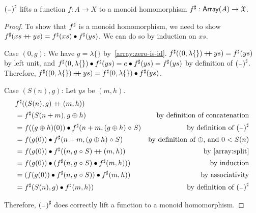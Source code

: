 \begin{propositionrep}
    ${({\scriptstyle{-}})}^{\sharp}$ lifts a function $f : A \to X$ to a monoid homomorphism ${f}^{\sharp} : \operatorname{\mathsf{Array}}(A) \to \mathfrak{X}$.
\end{propositionrep}

\begin{proof}
    To show that ${f}^{\sharp}$ is a monoid homomorphism,
    we need to show ${f}^{\sharp}(xs \mathbin{+\kern -0.4em+} ys) = {f}^{\sharp}(xs) \mathbin{\bullet} {f}^{\sharp}(ys)$.
    We can do so by induction on $xs$.

    Case $(0, g)$:
    We have $g = \lambda\{\}$ by~\cref{array:zero-is-id}.
    ${f}^{\sharp}((0, \lambda\{\}) \mathbin{+\kern -0.4em+} ys) = {f}^{\sharp}(ys)$ by left unit,
    and ${f}^{\sharp}(0, \lambda\{\}) \mathbin{\bullet} {f}^{\sharp}(ys) = e \mathbin{\bullet} {f}^{\sharp}(ys) = {f}^{\sharp}(ys)$
    by definition of ${({\scriptstyle{-}})}^{\sharp}$. Therefore,
    ${f}^{\sharp}((0, \lambda\{\}) \mathbin{+\kern -0.4em+} ys) = {f}^{\sharp}(0, \lambda\{\}) \mathbin{\bullet} {f}^{\sharp}(ys)$.

    Case $(S(n), g)$: Let $ys$ be $(m, h)$.
    \begin{align*}
         & \ext{f}((S(n), g) \doubleplus (m, h))                                                                              \\
         & = \ext{f}(S(n + m), g \oplus h)                                 & \text{by definition of concatenation}            \\
         & = f((g \oplus h)(0)) \mult \ext{f}(n + m, (g \oplus h) \comp S) & \text{by definition of $\ext{(\blank)}$}         \\
         & = f(g(0)) \mult \ext{f}(n + m, (g \oplus h) \comp S)            & \text{by definition of $\oplus$, and $0 < S(n)$} \\
         & = f(g(0)) \mult \ext{f}((n, g \comp S) \doubleplus (m, h))      & \text{by~\cref{array:split}}                     \\
         & = f(g(0)) \mult (\ext{f}(n, g \comp S) \mult \ext{f}(m, h)))    & \text{by induction}                              \\
         & = (f(g(0)) \mult \ext{f}(n, g \comp S)) \mult \ext{f}(m, h))    & \text{by associativity}                          \\
         & = \ext{f}(S(n), g) \mult \ext{f}(m, h))                         & \text{by definition of $\ext{(\blank)}$}         \\
    \end{align*}

    Therefore, ${({\scriptstyle{-}})}^{\sharp}$ does correctly lift a function to a monoid homomorphism.
\end{proof}

